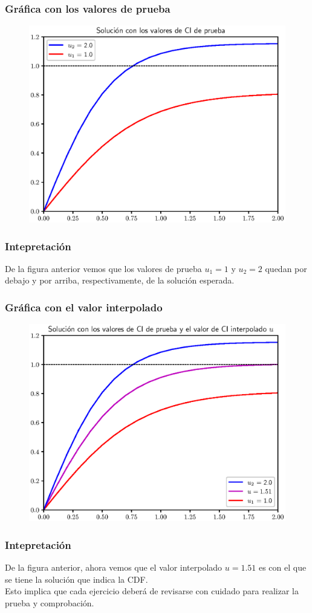 \documentclass[12pt]{beamer}
\begin{document}
\begin{frame}
\frametitle{Gráfica con los valores de prueba}
\begin{figure}
    \centering
    \includegraphics[scale=0.55]{Imagenes/plot_Ejercicio_01_Metodo_Disparo_01.eps}
\end{figure}
\end{frame}
\begin{frame}
\frametitle{Intepretación}
De la figura anterior vemos que los valores de prueba $u_{1} = 1$ y $u_{2} = 2$ quedan por debajo y por arriba, respectivamente, de la solución esperada.
\end{frame}
\begin{frame}
\frametitle{Gráfica con el valor interpolado}
\begin{figure}
    \centering
    \includegraphics[scale=0.55]{Imagenes/plot_Ejercicio_01_Metodo_Disparo_02.eps}
\end{figure}
\end{frame}
\begin{frame}
\frametitle{Intepretación}
De la figura anterior, ahora vemos que el valor interpolado $u = 1.51$ es con el que se tiene la solución que indica la CDF.
\\
\bigskip
\pause
Esto implica que cada ejercicio deberá de revisarse con cuidado para realizar la prueba y comprobación.
\end{frame}
\end{document}
